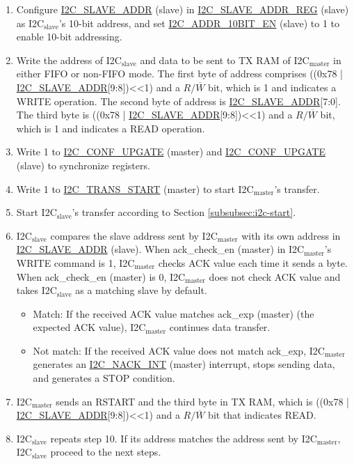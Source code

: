 \documentclass[main\_\_EN.tex]{subfiles}
\begin{document}
\begin{enumerate}
\item Configure \hyperref[fielddesc:I2CSLAVEADDR]{I2C\_SLAVE\_ADDR} (slave) in \hyperref[regdesc:I2CSLAVEADDRREG]{I2C\_SLAVE\_ADDR\_REG} (slave) as I2C$_\text{slave}$'s 10-bit address, and set \hyperref[fielddesc:I2CADDR10BITEN]{I2C\_ADDR\_10BIT\_EN} (slave) to 1 to enable 10-bit addressing.
\item Write the address of I2C$_\text{slave}$ and data to be sent to TX RAM of I2C$_\text{master}$ in either FIFO or non-FIFO mode. The first byte of address comprises ((0x78 | \hyperref[fielddesc:I2CSLAVEADDR]{I2C\_SLAVE\_ADDR}[9:8])<<1) and a $R/\overline W$ bit, which is 1 and indicates a WRITE operation. The second byte of address is \hyperref[fielddesc:I2CSLAVEADDR]{I2C\_SLAVE\_ADDR}[7:0]. The third byte is ((0x78 | \hyperref[fielddesc:I2CSLAVEADDR]{I2C\_SLAVE\_ADDR}[9:8])<<1) and a $R/\overline W$ bit, which is 1 and indicates a READ operation.

\item Write 1 to \hyperref[fielddesc:I2CCONFUPGATE]{I2C\_CONF\_UPGATE} (master) and \hyperref[fielddesc:I2CCONFUPGATE]{I2C\_CONF\_UPGATE} (slave) to synchronize registers.
\item Write 1 to \hyperref[fielddesc:I2CTRANSSTART]{I2C\_TRANS\_START} (master) to start I2C$_\text{master}$'s transfer.
\item Start I2C$_\text{slave}$'s transfer according to Section \ref{subsubsec:i2c-start}.
\item I2C$_\text{slave}$ compares the slave address sent by I2C$_\text{master}$ with its own address in \hyperref[fielddesc:I2CSLAVEADDR]{I2C\_SLAVE\_ADDR} (slave). When ack\_check\_en (master) in I2C$_\text{master}$'s WRITE command is 1, I2C$_\text{master}$ checks ACK value each time it sends a byte. When ack\_check\_en (master) is 0, I2C$_\text{master}$ does not check ACK value and takes I2C$_\text{slave}$ as a matching slave by default.
\begin{itemize}
\item Match: If the received ACK value matches ack\_exp (master) (the expected ACK value), I2C$_\text{master}$ continues data transfer.
\item Not match: If the received ACK value does not match ack\_exp, I2C$_\text{master}$ generates an \hyperref[int:i2c-nack]{I2C\_NACK\_INT} (master) interrupt, stops sending data, and generates a STOP condition.
\end{itemize}

\item I2C$_\text{master}$ sends an RSTART and the third byte in TX RAM, which is ((0x78 | \hyperref[fielddesc:I2CSLAVEADDR]{I2C\_SLAVE\_ADDR}[9:8])<<1) and a $R/\overline W$ bit that indicates READ.
\item I2C$_\text{slave}$ repeats step 10. If its address matches the address sent by I2C$_\text{master}$, I2C$_\text{slave}$ proceed to the next steps.


\end{enumerate}
\end{document}
